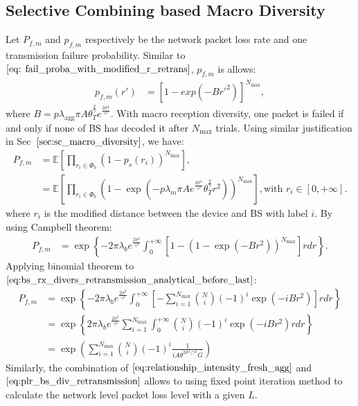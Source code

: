 \subsection{Selective Combining based Macro Diversity}
Let $P_{f, m}$ and $p_{f, m}$ respectively be the network packet loss rate and one transmission failure probability. Similar to $\eqref{eq: fail_proba_with_modified_r_retrans}$,  $p_{f, m}$ is allows:
\begin{align}
\label{eq: fail_proba_with_modified_r_retrans_macro_diversity}
p_{f, m}(r')
&= \left[ 1 - exp(-B {r'} ^ 2)\right] ^{N_{\text{max}}},
\end{align} 
where $B = p \lambda_{\text{agg}} \pi A \theta_{T}^{\frac{2}{\gamma}} e^{\frac{2\sigma^2}{\gamma^2}} $.
With macro reception diversity, one packet is failed if and only if none of BS has decoded it after $N_{\text{max}}$ trials. Using similar justification in Sec~$\ref{sec:sc_macro_diversity}$, we have:
\begin{align}
\label{eq:definition_pfm_retransmission}
P_{f,m} &= \mathbb{E}\left[  \prod_{r_i \in \Phi_{b}} (1-p_{s}(r_i))^{N_{\text{max}}} \right], \nonumber\\
& = \mathbb{E}\left[  \prod_{r_i \in \Phi_{b}} ( 1 - \exp(-p \lambda_{m} \pi A e^{\frac{2\sigma^2}{\gamma^2}} \theta_{T}^{\frac{2}{\gamma}} r^2 ) )^{N_{\text{max}}} \right], \text{with } r_i \in \left[0, +\infty\right].
\end{align} 
where $r_i$ is the modified distance between the device and BS with label $i$. By using Campbell theorem:
\begin{align}
\label{eq:bs_rx_divers_retransmission_analytical_before_last}
P_{f,m} &= \exp\left\lbrace -2\pi \lambda_{b} e^{\frac{2\sigma^2}{\gamma^2}}\int_{0}^{+\infty} \left[  1 - \left( 1-\exp(-Br^2) \right) ^{N_{\text{max}}} \right]  rdr \right\rbrace.
\end{align}
Applying binomial theorem to $\eqref{eq:bs_rx_divers_retransmission_analytical_before_last}$:
\begin{align}
	\label{eq:plr_bs_div_retransmission}
	P_{f,m} &= \exp\left\lbrace -2\pi \lambda_{b} e^{\frac{2\sigma^2}{\gamma^2}}\int_{0}^{+\infty} \left[ -\sum_{i=1}^{N_{\text{max}}} \binom{N}{i} (-1)^i \exp(-iBr^2) \right] rdr \right\rbrace \nonumber\\
	&= \exp\left\lbrace 2\pi \lambda_{b} e^{\frac{2\sigma^2}{\gamma^2}} \sum_{i=1}^{N_{\text{max}}} \int_{0}^{+\infty} \binom{N}{i} (-1)^i \exp(-iBr^2) rdr \right\rbrace \nonumber\\
	&= \exp(\sum_{i=1}^{N_{\text{max}}} \binom{N}{i} (-1)^{i} \frac{1 }{i A \theta^{2\sigma^2/\gamma^2} G })
\end{align}
Similarly, the combination of $\eqref{eq:relationship_intensity_fresh_agg}$ and $\eqref{eq:plr_bs_div_retransmission}$ allows to using fixed point iteration method to calculate the network level packet loss level with a given $L$.